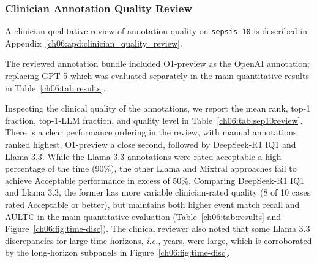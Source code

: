 
\subsubsection{Clinician Annotation Quality Review}

A clinician qualitative review of annotation quality on \texttt{sepsis-10} is described in Appendix~\ref{ch06:apd:clinician_quality_review}.

The reviewed annotation bundle included O1-preview as the OpenAI annotation; replacing GPT-5 which was evaluated separately in the main quantitative results in Table~\ref{ch06:tab:results}.

Inspecting the clinical quality of the annotations, we report the mean rank, top-1 fraction, top-1-LLM fraction, and quality level in Table~\ref{ch06:tab:sep10review}.
There is a clear performance ordering in the review, with manual annotations ranked highest, O1-preview a close second, followed by DeepSeek-R1 IQ1 and Llama 3.3.
While the Llama 3.3 annotations were rated acceptable a high percentage of the time (90\%), the other Llama and Mixtral approaches fail to achieve Acceptable performance in excess of 50\%.
Comparing DeepSeek-R1 IQ1 and Llama 3.3, the former has more variable clinician-rated quality (8 of 10 cases rated Acceptable or better), but maintains both higher event match recall and AULTC in the main quantitative evaluation (Table~\ref{ch06:tab:results} and Figure~\ref{ch06:fig:time-disc}).
The clinical reviewer also noted that some Llama 3.3 discrepancies for large time horizons, \emph{i.e.}, years, were large, which is corroborated by the long-horizon subpanels in Figure~\ref{ch06:fig:time-disc}.



